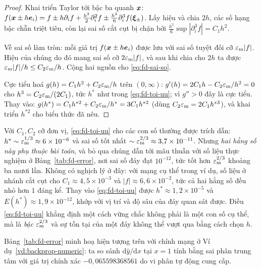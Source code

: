 \begin{proof}
Khai triển Taylor tới bậc ba quanh $\bm{x}$:
$f(\bm{x}\pm h\bm{e}_i) = f \pm h\partial_i f + \tfrac{h^2}{2}\partial_i^2 f
\pm \tfrac{h^3}{6}\partial_i^3 f(\bm{\xi}_\pm)$. Lấy hiệu và chia $2h$, các số
hạng bậc chẵn triệt tiêu, còn lại sai số cắt cụt bị chặn bởi
$\tfrac{h^2}{6}\sup|\partial_i^3 f| = C_1h^2$.
 
Về sai số làm tròn: mỗi giá trị $f(\bm{x}\pm h\bm{e}_i)$ được lưu với sai số tuyệt
đối cỡ $\varepsilon_{\mathrm{m}}|f|$. Hiệu của chúng do đó mang sai số cỡ $2\varepsilon_{\mathrm{m}}|f|$, và sau khi chia
cho $2h$ ta được $\varepsilon_{\mathrm{m}}|f|/h \le C_2\varepsilon_{\mathrm{m}}/h$. Cộng hai nguồn cho
\eqref{eq:fd-sai-so}.
 
Cực tiểu hoá $g(h) = C_1h^2 + C_2\varepsilon_{\mathrm{m}}/h$ trên $(0,\infty)$: $g'(h) = 2C_1 h -
C_2\varepsilon_{\mathrm{m}}/h^2 = 0$ cho $h^3 = C_2\varepsilon_{\mathrm{m}}/(2C_1)$, tức $h^*$ như trong
\eqref{eq:fd-toi-uu}; vì $g'' > 0$ đây là cực tiểu. Thay vào:
$g(h^*) = C_1 h^{*2} + C_2\varepsilon_{\mathrm{m}}/h^* = 3C_1h^{*2}$ (dùng
$C_2\varepsilon_{\mathrm{m}} = 2C_1h^{*3}$), và khai triển $h^{*2}$ cho biểu thức đã nêu.
\end{proof}
 
\begin{nhanxet}
\label{nx:fd-hang-so}
Với $C_1, C_2$ cỡ đơn vị, \eqref{eq:fd-toi-uu} cho các con số thường được trích
dẫn: $h^{*} \sim \varepsilon_{\mathrm{m}}^{1/3} \approx 6\times 10^{-6}$ và sai số tốt nhất
$\sim \varepsilon_{\mathrm{m}}^{2/3} \approx 3{,}7\times 10^{-11}$. Nhưng \emph{hai hằng số này phụ
thuộc bài toán}, và bỏ qua chúng dẫn tới mâu thuẫn với số liệu thực nghiệm ở
Bảng~\ref{tab:fd-error}, nơi sai số đáy đạt $10^{-12}$, tức tốt hơn
$\varepsilon_{\mathrm{m}}^{2/3}$ khoảng ba mươi lần. Không có nghịch lý ở đây: với mạng cụ thể trong
ví dụ, số liệu ở nhánh cắt cụt cho $C_1 \approx 4{,}5\times10^{-3}$ và
$|f| \approx 6{,}6\times10^{-2}$, tức cả hai hằng số đều nhỏ hơn $1$ đáng kể.
Thay vào \eqref{eq:fd-toi-uu} được $h^{*} \approx 1{,}2\times10^{-5}$ và
$E(h^{*}) \approx 1{,}9\times10^{-12}$, khớp với vị trí và độ sâu của đáy quan
sát được. Điều \eqref{eq:fd-toi-uu} khẳng định một cách vững chắc không phải là
một con số cụ thể, mà là \emph{bậc} $\varepsilon_{\mathrm{m}}^{2/3}$ và sự tồn tại của một đáy không
thể vượt qua bằng cách chọn $h$.
\end{nhanxet}
 
Bảng~\ref{tab:fd-error} minh hoạ hiện tượng trên với chính mạng ở
Ví dụ~\ref{vd:backprop-numeric}: ta so sánh $\mathrm{d}\hat{y}/\mathrm{d}x$ tại
$x=1$ tính bằng sai phân trung tâm với giá trị chính xác
$-0{,}065598368561$ do vi phân tự động cung cấp.
 
